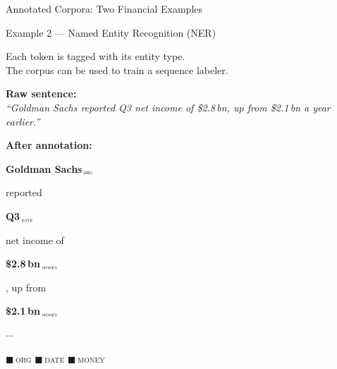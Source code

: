 \documentclass[aspectratio=169]{beamer}
\begin{document}
%
%
\begin{frame}{Annotated Corpora: Two Financial Examples}

\begin{block}{Example 2 --- Named Entity Recognition (NER)}

\vspace{0.2cm}

Each token is tagged with its entity type.\\
The corpus can be used to train a sequence labeler.

\vspace{0.2cm}

\textbf{Raw sentence:}\\[3pt]
\textit{``Goldman Sachs reported Q3 net income of \$2.8\,bn, up from \$2.1\,bn a year earlier.''}

\vspace{0.14cm}
\textbf{After annotation:}\\[5pt]

\vspace{0.2cm}

\small
\colorbox{CourseBlue!18}{\strut\textbf{Goldman Sachs}$_{\,\textsc{\tiny org}}$}
\; reported \;
\colorbox{Accent!45}{\strut\textbf{Q3}$_{\,\textsc{\tiny date}}$}
\; net income of \;
\colorbox{Forest!25}{\strut\textbf{\$2.8\,bn}$_{\,\textsc{\tiny money}}$}
, up from
\colorbox{Forest!25}{\strut\textbf{\$2.1\,bn}$_{\,\textsc{\tiny money}}$}
\; $\cdots$

\vspace{0.14cm}
\footnotesize
\textcolor{CourseBlue!80!black}{$\blacksquare$\,\textsc{org}}\quad
\textcolor{Accent!80!black}{$\blacksquare$\,\textsc{date}}\quad
\textcolor{Forest}{$\blacksquare$\,\textsc{money}}
\end{block}
\end{frame}
%
%
\end{document}
